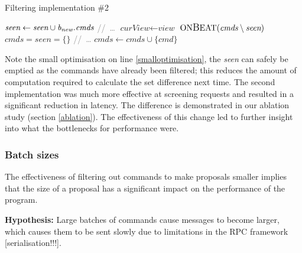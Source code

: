 \begin{algorithm}[h!]
	\caption{Filtering implementation \#2} \label{dedup2}
	\begin{algorithmic}[1]
			\State $ \textit{seen} \gets \textit{seen} \cup \textit{b\textsubscript{new}.cmds}$
			\State \textcolor{gray}{//\ \dots}
		\EndIf
	\EndProcedure
		\State $ \textit{curView} \gets \textit{view}$
		\State $ \text{ON{\large B}EAT}(\textit{cmds} \setminus \textit{seen})$
		\State $ \textit{cmds} = \textit{seen} = \{\}$ \label{smalloptimisation}
		\State \textcolor{gray}{//\ \dots}
	\EndProcedure
		\State $ \textit{cmds} \gets \textit{cmds} \cup \{\textit{cmd}\} $
	\EndProcedure
	\end{algorithmic}
\end{algorithm}

Note the small optimisation on line \ref{smalloptimisation}, the \textit{seen} can safely be emptied as the commands have already been filtered; this reduces the amount of computation required to calculate the set difference next time. The second implementation was much more effective at screening requests and resulted in a significant reduction in latency. The difference is demonstrated in our ablation study (section \ref{ablation}). The effectiveness of this change led to further insight into what the bottlenecks for performance were.

\subsubsection{Batch sizes} \label{batchsizes}
The effectiveness of filtering out commands to make proposals smaller implies that the size of a proposal has a significant impact on the performance of the program.%

\textbf{Hypothesis: } Large batches of commands cause messages to become larger, which causes them to be sent slowly due to limitations in the RPC framework [serialisation!!!].

